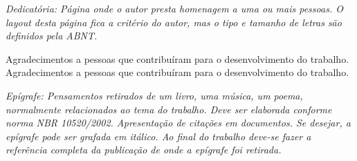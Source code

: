 













\capa


\folharosto


\folhaaprovacao


\dedicatoria
{
\textit{Dedicatória: Página onde o autor presta homenagem a uma ou mais pessoas.
O layout desta página fica a critério do autor, mas o tipo e tamanho de letras são definidos pela ABNT.}
}


\agradecimentos
{
Agradecimentos a pessoas que contribuíram para o desenvolvimento do trabalho.
Agradecimentos a pessoas que contribuíram para o desenvolvimento do trabalho.
}


\epigrafe
{
\textit{Epígrafe: Pensamentos retirados de um livro, uma música, um poema, normalmente relacionados ao tema do trabalho.
Deve ser elaborada conforme norma NBR 10520/2002. Apresentação de citações em documentos.
Se desejar, a epígrafe pode ser grafada em itálico.
Ao final do trabalho deve-se fazer a referência completa da publicação de onde a epígrafe foi retirada.}
}

